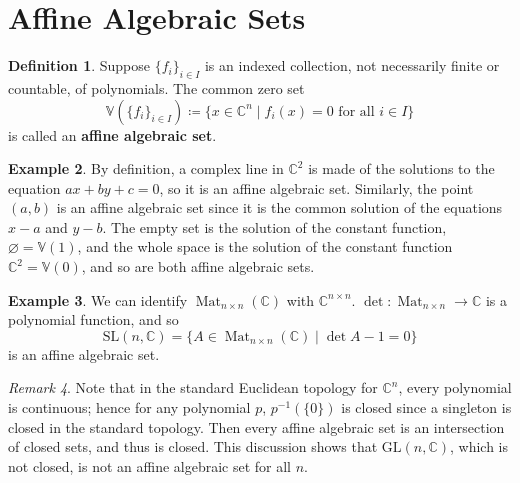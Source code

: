 \documentclass[letterpaper]{article}
\newtheorem{theorem}{Theorem}[section]
\theoremstyle{definition}
\newtheorem{definition}[theorem]{Definition}
\newtheorem{example}[theorem]{Example}
\theoremstyle{remark}
\newtheorem{remark}[theorem]{Remark}
\newcommand\CC{\mathbb{C}}
\newcommand\VV{\mathbb{V}}
\newcommand{\defeq}{\coloneqq}
\newcommand{\GL}{\mathrm{GL}}
\newcommand{\SL}{\mathrm{SL}}
\DeclareMathOperator{\Mat}{Mat}
\begin{document}




\section{Affine Algebraic Sets}

\begin{definition}
    Suppose $\{f_i\}_{i\in I}$ is an indexed collection, not necessarily finite or countable, of polynomials. The common zero set \[\VV(\{f_i\}_{i\in I})\defeq \{x\in \CC^n\mid f_i(x)=0\text{ for all }i\in I\} \] is called an \textbf{affine algebraic set}.
\end{definition}

\begin{example}
	By definition, a complex line in \(\CC^2\) is made of the solutions to the equation \(ax+by+c=0\), so it is an affine algebraic set. Similarly, the point \((a,b)\) is an affine algebraic set since it is the common solution of the equations \(x-a\) and \(y-b\). The empty set is the solution of the constant function, $\varnothing=\VV(1)$, and the whole space is the solution of the constant function $\CC^2=\VV(0)$, and so are both affine algebraic sets.
\end{example}
\begin{example}
    We can identify $\Mat_{n\times n}(\CC)$ with $\CC^{n\times n}$. $\det:\Mat_{n\times n}\to \CC$ is a polynomial function, and so \[\SL(n,\CC)=\{A\in\Mat_{n\times n}(\CC)\mid \det A-1=0\}\] is an affine algebraic set. 
\end{example}
\begin{remark}
Note that in the standard Euclidean topology for $\CC^n$, every polynomial is continuous; hence for any polynomial $p$, $p^{-1}(\{0\})$ is closed since a singleton is closed in the standard topology. Then every affine algebraic set is an intersection of closed sets, and thus is closed. This discussion shows that $\GL(n,\CC)$, which is not closed, is not an affine algebraic set for all $n$. 
\end{remark}
\end{document}

